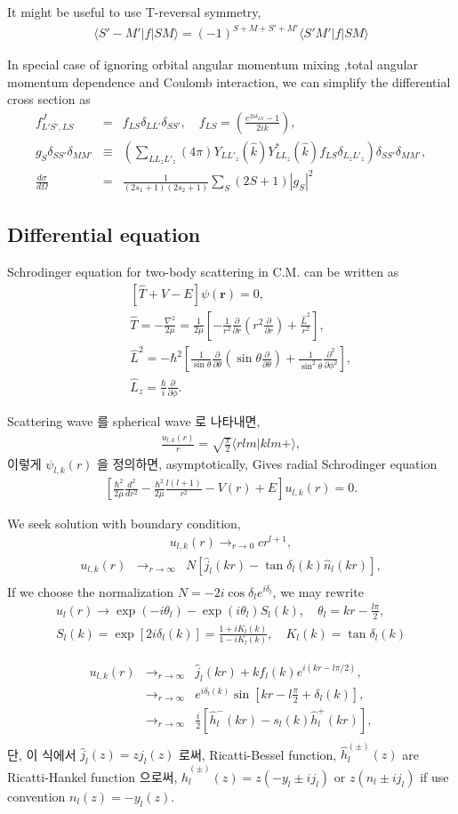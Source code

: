 \documentclass[10pt]{article}
\def\bm{\boldsymbol}
\newcommand{\bea}{\begin{eqnarray}}
\newcommand{\eea}{\end{eqnarray}}
\newcommand{\no}{\nonumber \\}
\newcommand{\del}{\partial}
\def\vr{{\bm r}}
\def\la{\langle}
\def\ra{\rangle}
\begin{document}
\begin{itemize}
It might be useful to use T-reversal symmetry,
\bea 
\la S' -M'|f|S M\ra =(-1)^{S+M+S'+M'}\la S' M'|f|S M\ra 
\eea 


In special case of ignoring orbital angular momentum mixing
,total angular momentum dependence and Coulomb interaction, 
we can simplify the differential cross section as 
\bea
f^{J}_{L' S',LS}&=& f_{LS}\delta_{LL'}\delta_{SS'},
\quad f_{LS}=
\left(\frac{e^{2i\delta_{LS}}-1}{2i k}\right),\no
 g_{S}\delta_{SS'}\delta_{MM'}
&\equiv&\left(\sum_{L L_z L'_z} (4\pi)Y_{L L'_z}(\hat{k}) Y^*_{L L_z}(\hat{k})
        f_{L S}\delta_{L_z L'_z}\right)
        \delta_{SS'}\delta_{MM'}
 ,\no
\frac{d\sigma}{d\Omega}
&=& \frac{1}{(2s_1+1)(2s_2+1)}
    \sum_{S}(2S+1) |g_S|^2 
\eea

\end{itemize}



\subsection{Differential equation}
Schrodinger equation for two-body scattering 
in C.M. can be written as
\bea
& &[\hat{T}+V-E]\psi(\vr)=0,\no
& &\hat{T}=-\frac{\nabla^2}{2\mu}
          =\frac{1}{2\mu}\left[-\frac{1}{r^2}\frac{\del}{\del r}
          (r^2\frac{\del}{\del r})+\frac{\hat{L}^2}{r^2}
          \right],\no
& &\hat{L}^2=-\hbar^2\left[
        \frac{1}{\sin\theta}\frac{\del}{\del\theta}
        (\sin\theta\frac{\del}{\del \theta})
        +\frac{1}{\sin^2\theta}\frac{\del^2}{\del\phi^2}        
\right],\no
& &\hat{L}_z=\frac{\hbar}{i}\frac{\del}{\del\phi}.         
\eea

Scattering wave 를 spherical wave 로 나타내면,
\bea
\frac{u_{l,k}(r)}{r}=\sqrt{\frac{\pi}{2}}\la r lm|k lm+\ra,
\eea
이렇게 $\psi_{l,k}(r)$ 을 정의하면,
asymptotically, 
Gives radial Schrodinger equation
\bea
\left[\frac{\hbar^2}{2\mu}\frac{d^2}{dr^2}-\frac{\hbar^2}{2\mu}\frac{l(l+1)}{r^2}-V(r)+E\right]u_{l,k}(r)=0.
\eea

We seek solution with boundary condition,
\bea
u_{l,k}(r)\to_{r\to 0} c r^{l+1},
\eea
\bea
u_{l,k}(r)&\rightarrow_{r\to \infty}& N[\hat{j}_{l}(kr)-\tan\delta_l(k)\hat{n}_l(kr)], \no  
\eea
If we choose the normalization $N=-2i \cos\delta_l e^{i\delta_l}$,
we may rewrite
\bea
u_l(r)\to \exp(-i\theta_l)-\exp(i\theta_l)S_l(k),\quad
\theta_l=kr-\frac{l\pi}{2},\no
S_l(k)=\exp[2i\delta_l(k)]=\frac{1+i K_l(k)}{1-iK_l(k)},
\quad K_l(k)=\tan\delta_l(k)
\eea


\bea
u_{l,k}(r)&\rightarrow_{r\to \infty}& \hat{j}_{l}(kr)+k f_l(k)e^{i(kr-l\pi/2)},\no
      &\rightarrow_{r\to \infty}& e^{i\delta_l(k)}\sin[kr-l\frac{\pi}{2}+\delta_l(k)],\no
                 &\rightarrow_{r\to\infty}&\frac{i}{2}[\hat{h}_l^{-}(kr)-s_l(k)\hat{h}_l^{+}(kr)],\no                 
\eea
단, 이 식에서 $\hat{j}_{l}(z)=z j_{l}(z)$ 로써, Ricatti-Bessel
function, 
$\hat{h}^{(\pm)}_l(z)$ are Ricatti-Hankel function 으로써,
$\hat{h}^{(\pm)}_l(z)=z(-y_l \pm i j_l)$ or $z(n_l\pm i j_l)$
if use convention $n_l(z)=-y_l(z)$.
\end{document}
